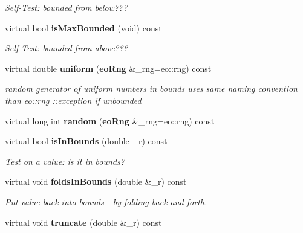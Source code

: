 \begin{CompactItemize}
\begin{CompactList}\small\item\em Self-Test: bounded from below??? \item\end{CompactList}\item 
virtual bool {\bf is\-Max\-Bounded} (void) const \label{classeo_int_interval_a8}

\begin{CompactList}\small\item\em Self-Test: bounded from above??? \item\end{CompactList}\item 
virtual double {\bf uniform} ({\bf eo\-Rng} \&\_\-rng=eo::rng) const \label{classeo_int_interval_a9}

\begin{CompactList}\small\item\em random generator of uniform numbers in bounds uses same naming convention than eo::rng ::exception if unbounded \item\end{CompactList}\item 
virtual long int {\bf random} ({\bf eo\-Rng} \&\_\-rng=eo::rng) const \label{classeo_int_interval_a10}

\item 
virtual bool {\bf is\-In\-Bounds} (double \_\-r) const \label{classeo_int_interval_a11}

\begin{CompactList}\small\item\em Test on a value: is it in bounds? \item\end{CompactList}\item 
virtual void {\bf folds\-In\-Bounds} (double \&\_\-r) const \label{classeo_int_interval_a12}

\begin{CompactList}\small\item\em Put value back into bounds - by folding back and forth. \item\end{CompactList}\item 
virtual void {\bf truncate} (double \&\_\-r) const \label{classeo_int_interval_a13}


\end{CompactItemize}
